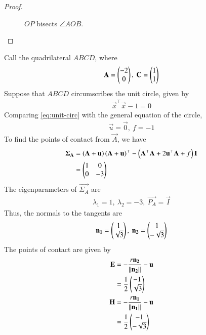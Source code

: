 \documentclass[journal,12pt,twocolumn]{IEEEtran}
\begin{document}
\begin{enumerate}
\begin{proof}
\begin{figure}[!ht]
            \caption{$OP$ bisects $\angle AOB$.}
            \label{fig:tangent}
        \end{figure}
    \end{proof}
    Call the quadrilateral $ABCD$, where
    \begin{align}
        \mathbf{A} = \begin{pmatrix}-2\\0\end{pmatrix},\ \mathbf{C} = \begin{pmatrix}1\\1\end{pmatrix}
        \label{eq:a-c-def}
    \end{align}
    Suppose that $ABCD$ circumscribes the unit circle, given by
    \begin{align}
        \vec{x}^\top\vec{x} - 1 = 0
        \label{eq:unit-circ}
    \end{align}
    Comparing \eqref{eq:unit-circ} with the general equation of the circle,
    \begin{align}
        \vec{u} = \vec{0},\ f = -1
        \label{eq:u-f-val}
    \end{align}
    To find the points of contact from $\vec{A}$, we have
    \begin{align}
        \mathbf{\Sigma_A} &= \left(\mathbf{A}+\mathbf{u}\right)\left(\mathbf{A}+\mathbf{u}\right)^\top - \left(\mathbf{A}^\top\mathbf{A}+2\mathbf{u}^\top\mathbf{A} + f\right)\mathbf{I} \\
                     &= \begin{pmatrix}1&0\\0&-3\end{pmatrix}
                     \label{eq:sigma}
    \end{align}
    The eigenparameters of $\vec{\Sigma_A}$ are
    \begin{align}
        \lambda_1 = 1,\ \lambda_2 = -3,\ \vec{P_A} = \vec{I}
        \label{eq:lambda}
    \end{align}
    Thus, the normals to the tangents are
    \begin{align}
        \mathbf{n_1} = \begin{pmatrix}1\\\sqrt{3}\end{pmatrix},\ \mathbf{n_2} = \begin{pmatrix}1\\-\sqrt{3}\end{pmatrix}
        \label{eq:n-sigma}
    \end{align}
    The points of contact are given by
    \begin{align}
        \vec{E} &= -\frac{r\vec{n_2}}{\norm{\vec{n_2}}} - \vec{u} \\
                &= \frac{1}{2}\myvec{-1\\\sqrt{3}} \label{eq:poc-e} \\
        \vec{H} &= -\frac{r\vec{n_1}}{\norm{\vec{n_1}}} - \vec{u} \\
                &= \frac{1}{2}\myvec{-1\\-\sqrt{3}} \label{eq:poc-h}

\end{align}
\end{enumerate}
\end{document}
